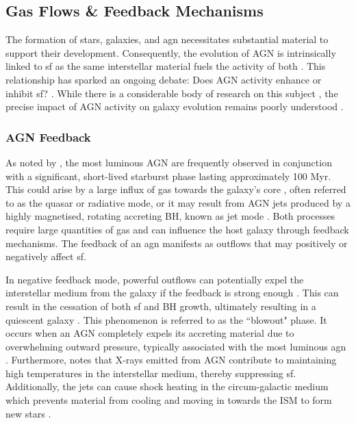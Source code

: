 \subsection{Gas Flows \& Feedback Mechanisms} \label{Sec: Feedback}
The formation of stars, galaxies, and \gls{agn} necessitates substantial material to support their development. Consequently, the evolution of AGN is intrinsically linked to \gls{sf} as the same interstellar material fuels the activity of both \citep{huang_local_2007, hopkins_cosmological_2008, biviano_spitzer_2011, katsianis_evolution_2017, symeonidis_agn_2021}. This relationship has sparked an ongoing debate: Does AGN activity enhance or inhibit \gls{sf}? \citep{fiore_agn_2017}. While there is a considerable body of research on this subject \citep{merloni_synthesis_2008, hopkins_how_2010, schawinski_observational_2007, cicone_massive_2014, reines_relations_2015, kauffmann_host_2003, silk_unleashing_2013, cowley_zfourge_2016}, the precise impact of AGN activity on galaxy evolution remains poorly understood \citep{fiore_agn_2017}. 

\subsubsection{AGN Feedback}
As noted by \cite{hopkins_cosmological_2008}, the most luminous AGN are frequently observed in conjunction with a significant, short-lived starburst phase lasting approximately 100 Myr. This could arise by a large influx of gas towards the galaxy's core \citep{hopkins_how_2010}, often referred to as the quasar or radiative mode, or it may result from AGN jets produced by a highly magnetised, rotating accreting BH, known as jet mode \citep{blandford_relativistic_2019}. Both processes require large quantities of gas and can influence the host galaxy through feedback mechanisms. The feedback of an \gls{agn} manifests as outflows that may positively or negatively affect \gls{sf}. 

In negative feedback mode, powerful outflows can potentially expel the interstellar medium from the galaxy if the feedback is strong enough \citep{fiore_agn_2017, schawinski_observational_2007, cicone_massive_2014}. This can result in the cessation of both \gls{sf} and BH growth, ultimately resulting in a quiescent galaxy \citep{hopkins_how_2010}. This phenomenon is referred to as the ``blowout" phase. It occurs when an AGN completely expels its accreting material due to overwhelming outward pressure, typically associated with the most luminous \gls{agn} \citep{hickox_obscured_2018}. Furthermore, \cite{mcnamara_heating_2007} notes that X-rays emitted from AGN contribute to maintaining high temperatures in the interstellar medium, thereby suppressing \gls{sf}. Additionally, the jets can cause shock heating in the circum-galactic medium which prevents material from cooling and moving in towards the ISM to form new stars \citep{heckman_nature_1990}. 

